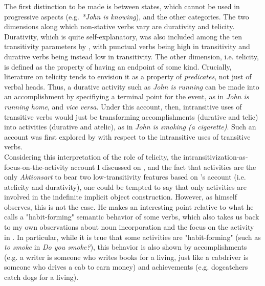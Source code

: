 The first distinction to be made is between states, which cannot be used in progressive aspects (e.g. \textit{*John is knowing}), and the other categories. The two dimensions along which non-stative verbs vary are durativity and telicity. Durativity, which is quite self-explanatory, was also included among the ten transitivity parameters by \textcite{HopperThompson1980}, with punctual verbs being high in transitivity and durative verbs being instead low in transitivity. The other dimension, i.e. telicity, is defined as the property of having an endpoint of some kind. Crucially, literature on telicity tends to envision it as a property of \textit{predicates}, not just of verbal heads. Thus, a durative activity such as \textit{John is running} can be made into an accomplishment by specifiying a terminal point for the event, as in \textit{John is running home}, and \textit{vice versa}. Under this account, then, intransitive uses of transitive verbs would just be transforming accomplishments (durative and telic) into activities (durative and atelic), as in \textit{John is smoking (a cigarette)}. Such an account was first explored by \textcite{Mittwoch1982} with respect to the intransitive uses of transitive verbs.\\
Considering this interpretation of the role of telicity, the intransitivization-as-focus-on-the-activity account I discussed on , and the fact that activities are the only \textit{Aktionsart} to bear two low-transitivity features based on \textcite{HopperThompson1980}'s account (i.e. atelicity and durativity), one could be tempted to say that only activities are involved in the indefinite implicit object construction. However, as \textcite[151]{Vendler1957} himself observes, this is not the case. He makes an interesting point relative to what he calls a "habit-forming" semantic behavior of some verbs, which also takes us back to my own observations about noun incorporation and the focus on the activity in . In particular, while it is true that some activities are "habit-forming" (such as \textit{to smoke} in \textit{Do you smoke?}), this behavior is also shown by accomplishments (e.g. a writer is someone who writes books for a living, just like a cabdriver is someone who drives a cab to earn money) and achievements (e.g. dogcatchers catch dogs for a living).\\

